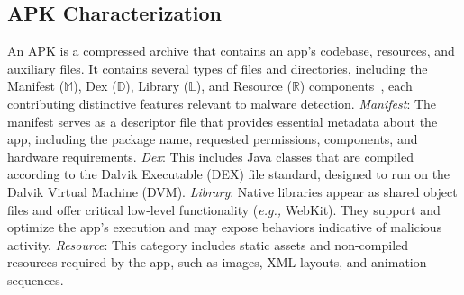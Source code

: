 

\subsection{APK Characterization}
\label{sub:apk_characterization}
An APK is a compressed archive that contains an app's codebase, resources, and auxiliary files.
It contains several types of files and directories, including the Manifest ($\mathbb{M}$), Dex ($\mathbb{D}$), Library ($\mathbb{L}$), and Resource ($\mathbb{R}$) components~\cite{faruki2014android,apkfile}, each contributing distinctive features relevant to malware detection.
\textit{Manifest}: The manifest serves as a descriptor file that provides essential metadata about the app, including the package name, requested permissions, components, and hardware requirements.
\textit{Dex}: This includes Java classes that are compiled according to the Dalvik Executable (DEX) file standard, designed to run on the Dalvik Virtual Machine (DVM).
\textit{Library}: Native libraries appear as shared object files and offer critical low-level functionality (\textit{e.g.,} WebKit). They support and optimize the app’s execution and may expose behaviors indicative of malicious activity.
\textit{Resource}: This category includes static assets and non-compiled resources required by the app, such as images, XML layouts, and animation sequences.

